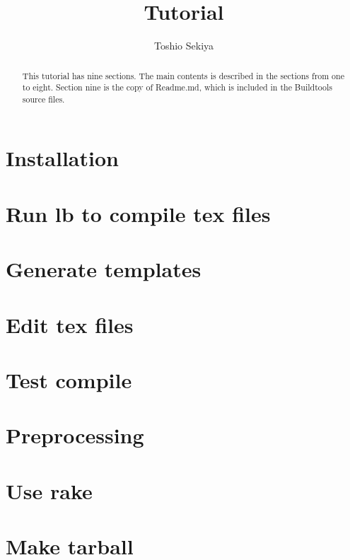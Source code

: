 \documentclass{article}
\title{Tutorial}
\author{Toshio Sekiya} %
\begin{document}
\maketitle
\tableofcontents

\newpage
\begin{abstract}
This tutorial has nine sections.
The main contents is described in the sections from one to eight.
Section nine is the copy of Readme.md, which is included in the Buildtools source files.
\end{abstract}

\section{Installation}
  
\section{Run lb to compile tex files}
  
\section{Generate templates}
  
\section{Edit tex files}
  
\section{Test compile}\label{sec:testcompile}
  
\section{Preprocessing}
  
\section{Use rake}
  
\section{Make tarball}
  

\end{document}
